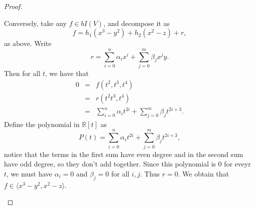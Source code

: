 \begin{proof}
\begin{enumerate}
        Conversely, take any $f\in bI(V)$, and decompose it as
         $$f = h_1(x^3 - y^2) + h_2(x^2 - z) + r,$$
         as above. Write
         $$r = \sum_{i=0}^n \alpha_i x^i + \sum_{j=0}^m \beta_j x^j y.$$
         Then for all $t$, we have that
         \begin{eqnarray*}
             0 & = & f(t^2, t^3, t^4)\\
             & = & r(t^2 t^3, t^4)\\
             & = & \sum_{i=0}^n \alpha_i t^{2i} + \sum_{j=0}^m \beta_j t^{2i+3}.
         \end{eqnarray*}
         Define the polynomial in $\mathbb{R}[t]$ as
         $$P(t) = \sum_{i=0}^n \alpha_i t^{2i} + \sum_{j=0}^m \beta_j t^{2i+3},$$
         notice that the terms in the first sum have even degree and in the second sum have odd degree, so they don't add together. Since this polynomial is $0$ for eveyr $t$, we must have $\alpha_i = 0$ and $\beta_j = 0$ for all $i,j$. Thus $r=0$. We obtain that $f\in \langle x^3 - y^2, x^2 - z\rangle$.
\end{enumerate}
\end{proof}

